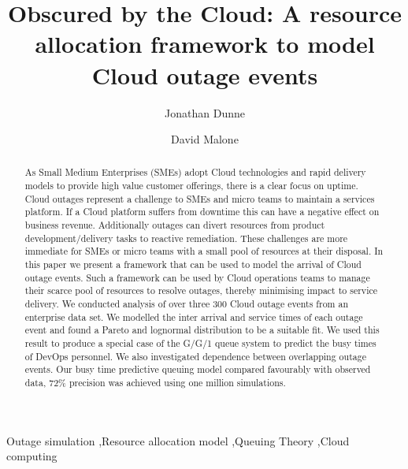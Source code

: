 \documentclass[5p]{elsarticle}
\begin{document}
\begin{frontmatter}

\title{Obscured by the Cloud: A resource allocation framework to model Cloud outage events}


\author[mymainaddress]{Jonathan Dunne}

\author[mymainaddress]{David Malone}

\address[mymainaddress]{Hamilton Institute, Maynooth University, Kildare, Ireland}

\begin{abstract}
As Small Medium Enterprises (SMEs) adopt Cloud technologies and rapid delivery models to provide high value customer offerings, there is a clear focus on uptime. Cloud outages represent a challenge to SMEs and micro teams to maintain a services platform. If a Cloud platform suffers from downtime this can have a negative effect on business revenue. Additionally outages can divert resources from product development/delivery tasks to reactive remediation. These challenges are more immediate for SMEs or micro teams with a small pool of resources at their disposal. In this paper we present a framework that can be used to model the arrival of Cloud outage events. Such a framework can be used by Cloud operations teams to manage their scarce pool of resources to resolve outages, thereby minimising impact to service delivery. We conducted analysis of over three 300 Cloud outage events from an enterprise data set. We modelled the inter arrival and service times of each outage event and found a Pareto and lognormal distribution to be a suitable fit. We used this result to produce a special case of the G/G/1 queue system to predict the busy times of DevOps personnel. We also investigated dependence between overlapping outage events. Our busy time predictive queuing model compared favourably with observed data, 72\% precision was achieved using one million simulations. 

\end{abstract}

\begin{keyword}
Outage simulation \sep Resource allocation model \sep Queuing Theory \sep Cloud computing
\end{keyword}

\end{frontmatter}
\end{document}

